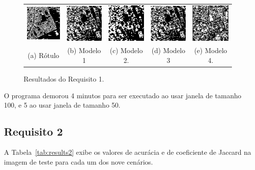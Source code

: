 \documentclass{bmvc2k}
\begin{document}
\begin{figure}[htb]
\begin{tabular}{ccccc}
  \includegraphics[width=20mm]{figs/test_label.jpg} &  \includegraphics[width=20mm]{figs/prev_teste50.jpg} &   \includegraphics[width=20mm]{figs/prev_teste100.jpg} &  \includegraphics[width=20mm]{figs/prev_teste_gray.jpg} & \includegraphics[width=20mm]{figs/neighbors10.jpg} \\ 
(a) Rótulo & (b) Modelo 1 & (c) Modelo 2. & (d) Modelo 3 & (e) Modelo 4. \\[6pt]
\end{tabular}
\caption{Resultados do Requisito 1.}
\label{fig:results1}
\end{figure}

O programa demorou 4 minutos para ser executado ao usar janela de tamanho 100, e 5 ao usar janela de tamanho 50.
\subsection{Requisito 2}

A Tabela~\ref{tab:results2} exibe os valores de acurácia e de coeficiente de Jaccard na imagem de teste para cada um dos nove cenários.
\end{document}
